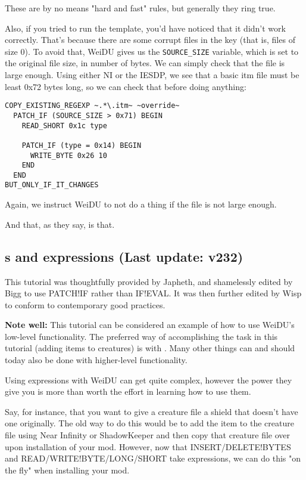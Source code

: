 \documentclass{article}
\def\ttref#1{\ahrefloc{#1}{\tt #1}}
\begin{document}
These are by no means "hard and fast" rules, but generally they ring true.

Also, if you tried to run the template, you'd have noticed that it didn't work
correctly. That's because there are some corrupt files in the key (that is,
files of size 0). To avoid that, WeiDU gives us the \verb+SOURCE_SIZE+ variable,
which is set to the original file size, in number of bytes. We can simply check that the
file is large enough. Using either NI or the IESDP, we see that a basic itm file must be
least 0x72 bytes long, so we can check that before doing anything:

\begin{verbatim}
COPY_EXISTING_REGEXP ~.*\.itm~ ~override~
  PATCH_IF (SOURCE_SIZE > 0x71) BEGIN
    READ_SHORT 0x1c type

    PATCH_IF (type = 0x14) BEGIN
      WRITE_BYTE 0x26 10
    END
  END
BUT_ONLY_IF_IT_CHANGES
\end{verbatim}

Again, we instruct WeiDU to not do a thing if the file is not large enough.

And that, as they say, is that.

\subsection{\ttref{value}s and expressions  (Last update: v232)}
This tutorial was thoughtfully provided by Japheth, and shamelessly edited
by Bigg to use PATCH!IF rather than IF!EVAL. It was then further edited by
Wisp to conform to contemporary good practices.

\textbf{Note well:} This tutorial can be considered an example of how to use
WeiDU's low-level functionality. The preferred way of accomplishing the task in
this tutorial (adding items to creatures) is with \ttref{ADD!CRE!ITEM}. Many
other things can and should today also be done with higher-level functionality.

Using expressions with WeiDU can get quite complex, however the power they
give you is more than worth the effort in learning how to use them.

Say, for instance, that you want to give a creature file a shield that
doesn't have one originally.  The old way to do this would be to add the
item to the creature file using Near Infinity or ShadowKeeper and then copy
that creature file over upon installation of your mod.  However, now that
INSERT/DELETE!BYTES and READ/WRITE!BYTE/LONG/SHORT take expressions, we can
do this "on the fly" when installing your mod.
\end{document}
